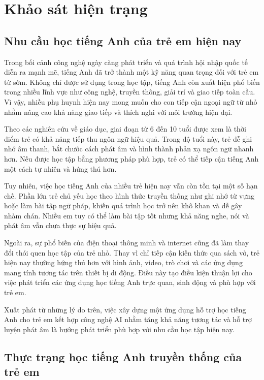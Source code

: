 \section{Khảo sát hiện trạng}

\subsection{Nhu cầu học tiếng Anh của trẻ em hiện nay}

Trong bối cảnh công nghệ ngày càng phát triển và quá trình hội nhập quốc tế diễn ra mạnh mẽ, tiếng Anh đã trở thành một kỹ năng quan trọng đối với trẻ em từ sớm. Không chỉ được sử dụng trong học tập, tiếng Anh còn xuất hiện phổ biến trong nhiều lĩnh vực như công nghệ, truyền thông, giải trí và giao tiếp toàn cầu. Vì vậy, nhiều phụ huynh hiện nay mong muốn cho con tiếp cận ngoại ngữ từ nhỏ nhằm nâng cao khả năng giao tiếp và thích nghi với môi trường hiện đại.


Theo các nghiên cứu về giáo dục, giai đoạn từ 6 đến 10 tuổi được xem là thời điểm trẻ có khả năng tiếp thu ngôn ngữ hiệu quả. Trong độ tuổi này, trẻ dễ ghi nhớ âm thanh, bắt chước cách phát âm và hình thành phản xạ ngôn ngữ nhanh hơn. Nếu được học tập bằng phương pháp phù hợp, trẻ có thể tiếp cận tiếng Anh một cách tự nhiên và hứng thú hơn.


Tuy nhiên, việc học tiếng Anh của nhiều trẻ hiện nay vẫn còn tồn tại một số hạn chế. Phần lớn trẻ chủ yếu học theo hình thức truyền thống như ghi nhớ từ vựng hoặc làm bài tập ngữ pháp, khiến quá trình học trở nên khô khan và dễ gây nhàm chán. Nhiều em tuy có thể làm bài tập tốt nhưng khả năng nghe, nói và phát âm vẫn chưa thực sự hiệu quả.


Ngoài ra, sự phổ biến của điện thoại thông minh và internet cũng đã làm thay đổi thói quen học tập của trẻ nhỏ. Thay vì chỉ tiếp cận kiến thức qua sách vở, trẻ hiện nay thường hứng thú hơn với hình ảnh, video, trò chơi và các ứng dụng mang tính tương tác trên thiết bị di động. Điều này tạo điều kiện thuận lợi cho việc phát triển các ứng dụng học tiếng Anh trực quan, sinh động và phù hợp với trẻ em.


Xuất phát từ những lý do trên, việc xây dựng một ứng dụng hỗ trợ học tiếng Anh cho trẻ em kết hợp công nghệ AI nhằm tăng khả năng tương tác và hỗ trợ luyện phát âm là hướng phát triển phù hợp với nhu cầu học tập hiện nay.


\subsection{Thực trạng học tiếng Anh truyền thống của trẻ em}


